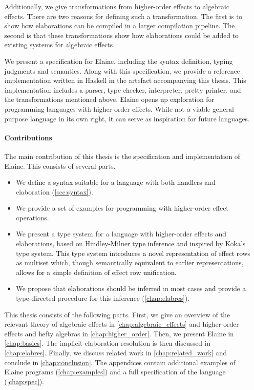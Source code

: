 Additionally, we give transformations from higher-order effects to algebraic effects. There are two reasons for defining such a transformation. The first is to show how elaborations can be compiled in a larger compilation pipeline. The second is that these transformations show how elaborations could be added to existing systems for algebraic effects.

We present a specification for Elaine, including the syntax definition, typing judgments and semantics. Along with this specification, we provide a reference implementation written in Haskell in the artefact accompanying this thesis. This implementation includes a parser, type checker, interpreter, pretty printer, and the transformations mentioned above. Elaine opens up exploration for programming languages with higher-order effects. While not a viable general purpose language in its own right, it can serve as inspiration for future languages.


\paragraph{Contributions} The main contribution of this thesis is the specification and implementation of Elaine. This consists of several parts.
\begin{itemize}
    \item We define a syntax suitable for a language with both handlers and elaboration (\cref{sec:syntax}).
    \item We provide a set of examples for programming with higher-order effect operations.
    \item We present a type system for a language with higher-order effects and elaborations, based on Hindley-Milner type inference and inspired by Koka's type system. This type system introduces a novel representation of effect rows as multiset which, though semantically equivalent to earlier representations, allows for a simple definition of effect row unification.
    \item We propose that elaborations should be inferred in most cases and provide a type-directed procedure for this inference (\cref{chap:elabres}).
\end{itemize}
This thesis consists of the following parts. First, we give an overview of the relevant theory of algebraic effects in \cref{chap:algebraic_effects} and higher-order effects and hefty algebras in \cref{chap:higher_order}. Then, we present Elaine in \cref{chap:basics}. The implicit elaboration resolution is then discussed in \cref{chap:elabres}. Finally, we discuss related work in \cref{chap:related_work} and conclude in \cref{chap:conclusion}. The appendices contain additional examples of Elaine programs (\cref{chap:examples}) and a full specification of the language (\cref{chap:spec}).

